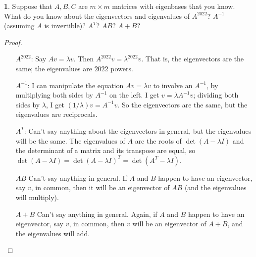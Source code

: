 \documentclass{article}
\theoremstyle{definition}
\newtheorem{prob}{}
\begin{document}
	\begin{prob}
	Suppose that $A, B, C$ are $m \times m$ matrices with eigenbases that you know.
 What do you know about the eigenvectors and eigenvalues of $A^{2022}$? $A^{-1}$ (assuming $A$ is invertible)? $A^T$? $AB$? $A+B$?

	\end{prob}

\begin{proof}\ 
	
	\begin{itemize}
		\item[$A^{2022}$:] Say $Av=\lambda v$. Then $A^{2022}v= \lambda^{2022}v$. That is, the eigenvectors are the same; the eigenvalues are $2022$ powers.
		\item[$A^{-1}$:] I can manipulate the equation $Av=\lambda v$ to involve an $A^{-1}$, by multiplying both sides by $A^{-1}$ on the left. I get $v= \lambda A^{-1}v$; dividing both sides by $\lambda$, I get $(1/\lambda) v= A^{-1}v$. So the eigenvectors are the same, but the eigenvalues are reciprocals.
		\item[$A^T$:] Can't say anything about the eigenvectors in general, but the eigenvalues will be the same. The eigenvalues of $A$ are the roots of $\det(A-\lambda I)$ and the determinant of a matrix and its transpose are equal, so $\det(A-\lambda I)= \det(A-\lambda I)^T= \det(A^T-\lambda I)$. 
		\item[$AB$] Can't say anything in general. If $A$ and $B$ happen to have an eigenvector, say $v$, in common, then it will be an eigenvector of $AB$ (and the eigenvalues will multiply).
		\item[$A+B$] Can't say anything in general. Again, if $A$ and $B$ happen to have an eigenvector, say $v$, in common, then $v$ will be an eigenvector of $A+B$, and the eigenvalues will add.
	\end{itemize}
\end{proof}
\end{document}
